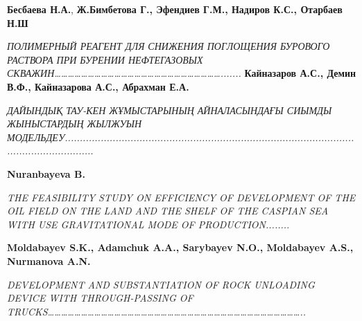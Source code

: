 {\bfseries Бесбаева Н.А.}, {\bfseries Ж.Бимбетова Г., Эфендиев Г.М., Надиров
К.С., Отарбаев Н.Ш}

\emph{ПОЛИМЕРНЫЙ РЕАГЕНТ ДЛЯ СНИЖЕНИЯ ПОГЛОЩЕНИЯ БУРОВОГО РАСТВОРА ПРИ
БУРЕНИИ НЕФТЕГАЗОВЫХ
СКВАЖИН\ldots\ldots\ldots\ldots\ldots\ldots\ldots\ldots\ldots\ldots\ldots\ldots\ldots\ldots\ldots\ldots\ldots\ldots\ldots\ldots\ldots\ldots\ldots\ldots\ldots.......}
{\bfseries Кайназаров А.С., Демин В.Ф., Кайназарова А.С., Абрахман Е.А.}

\emph{ДАЙЫНДЫҚ ТАУ-КЕН ЖҰМЫСТАРЫНЫҢ АЙНАЛАСЫНДАҒЫ СИЫМДЫ ЖЫНЫСТАРДЫҢ
ЖЫЛЖУЫН
МОДЕЛЬДЕУ..............................................................................................................................}

{\bfseries Nuranbayeva B.}

\emph{THE FEASIBILITY STUDY ON EFFICIENCY OF DEVELOPMENT OF THE OIL
FIELD ON THE LAND AND THE SHELF OF THE CASPIAN SEA WITH USE
GRAVITATIONAL MODE OF PRODUCTION........}

{\bfseries Moldabayev S.K., Adamchuk A.A., Sarybayev N.O., Moldabayev A.S.,
Nurmanova A.N.}

\emph{DEVELOPMENT AND SUBSTANTIATION OF ROCK UNLOADING DEVICE WITH
THROUGH-PASSING OF
TRUCKS\ldots\ldots\ldots\ldots\ldots\ldots\ldots\ldots\ldots\ldots\ldots\ldots\ldots\ldots\ldots\ldots\ldots\ldots\ldots\ldots\ldots\ldots\ldots\ldots\ldots\ldots\ldots\ldots\ldots\ldots\ldots\ldots\ldots\ldots\ldots\ldots\ldots\ldots..}
